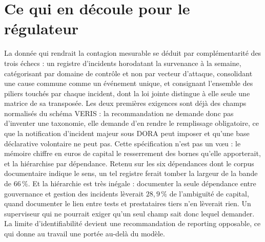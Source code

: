 
\section{Ce qui en découle pour le régulateur}
La donnée qui rendrait la contagion mesurable se déduit par complémentarité des trois échecs :
un registre d'incidents horodatant la survenance à la semaine, catégorisant par
domaine de contrôle et non par vecteur d'attaque, consolidant une cause commune
comme un événement unique, et consignant l'ensemble des piliers touchés par chaque incident,
dont la loi jointe distingue à elle seule une matrice de sa transposée. Les deux premières exigences sont déjà des champs normalisés du
schéma VERIS : la recommandation ne demande donc pas d'inventer une taxonomie, elle
demande d'en rendre le remplissage obligatoire, ce que la notification d'incident
majeur sous DORA peut imposer et qu'une base déclarative volontaire ne peut pas. Cette
spécification n'est pas un v\oe{}u : le mémoire chiffre en euros de capital le resserrement des
bornes qu'elle apporterait, et la hiérarchise par dépendance. Retenu sur les six dépendances dont
le corpus documentaire indique le sens, un tel registre ferait tomber la largeur de la bande de
$66\,\%$. Et la hiérarchie est très inégale : documenter la seule dépendance entre gouvernance et
gestion des incidents lèverait $28{,}9\,\%$ de l'ambiguïté de capital, quand documenter le lien
entre tests et prestataires tiers n'en lèverait rien. Un superviseur qui ne pourrait exiger qu'un
seul champ sait donc lequel demander. La limite d'identifiabilité
devient une recommandation de reporting opposable, ce qui donne au travail une portée
au-delà du modèle.


